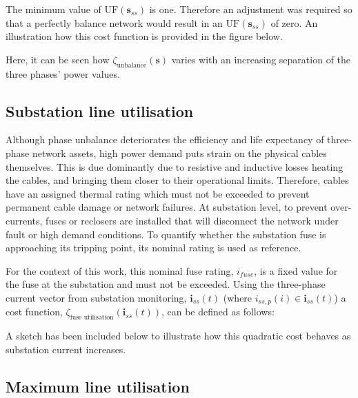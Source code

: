 

The minimum value of $\text{UF}(\textbf{s}_{ss})$ is one.
Therefore an adjustment was required so that a perfectly balance network would result in an $\text{UF}(\textbf{s}_{ss})$ of zero.
An illustration how this cost function is provided in the figure below.



Here, it can be seen how $\zeta_\text{unbalance}(\textbf{s})$ varies with an increasing separation of the three phases' power values.

\subsection{Substation line utilisation}
\label{ch1:subsec:substation-line-utilisation}

Although phase unbalance deteriorates the efficiency and life expectancy of three-phase network assets, high power demand puts strain on the physical cables themselves.
This is due dominantly due to resistive and inductive losses heating the cables, and bringing them closer to their operational limits.
Therefore, cables have an assigned thermal rating which must not be exceeded to prevent permanent cable damage or network failures.
At substation level, to prevent over-currents, fuses or reclosers are installed that will disconnect the network under fault or high demand conditions.
To quantify whether the substation fuse is approaching its tripping point, its nominal rating is used as reference.

For the context of this work, this nominal fuse rating, $i_{fuse}$, is a fixed value for the fuse at the substation and must not be exceeded.
Using the three-phase current vector from substation monitoring, $\textbf{i}_{ss}(t)$ (where $i_{ss,p}(i) \in \textbf{i}_{ss}(t)$) a cost function, $\zeta_\text{fuse utilisation}(\textbf{i}_{ss}(t))$, can be defined as follows:



A sketch has been included below to illustrate how this quadratic cost behaves as substation current increases.



\subsection{Maximum line utilisation}
\label{ch1:subsec:maximum-line-utilisation}

